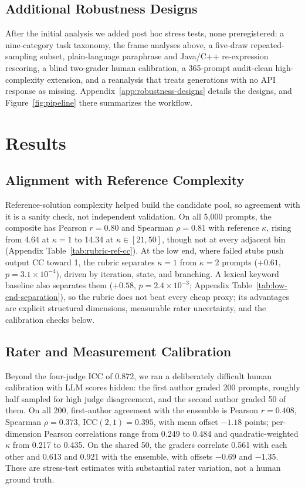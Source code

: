 \documentclass{article}
\begin{document}
\subsection{Additional Robustness Designs}
After the initial analysis we added post hoc stress tests, none preregistered: a nine-category task taxonomy, the frame analyses above, a five-draw repeated-sampling subset, plain-language paraphrase and Java/C++ re-expression rescoring, a blind two-grader human calibration, a 365-prompt audit-clean high-complexity extension, and a reanalysis that treats generations with no API response as missing. Appendix~\ref{app:robustness-designs} details the designs, and Figure~\ref{fig:pipeline} there summarizes the workflow.

\section{Results}

\subsection{Alignment with Reference Complexity}

Reference-solution complexity helped build the candidate pool, so agreement with it is a sanity check, not independent validation. On all 5{,}000 prompts, the composite has Pearson $r=0.80$ and Spearman $\rho=0.81$ with reference $\kappa$, rising from 4.64 at $\kappa=1$ to 14.34 at $\kappa\in[21,50]$, though not at every adjacent bin (Appendix Table~\ref{tab:rubric-ref-cc}). At the low end, where failed stubs push output CC toward 1, the rubric separates $\kappa=1$ from $\kappa=2$ prompts ($+0.61$, $p=3.1\times10^{-4}$), driven by iteration, state, and branching. A lexical keyword baseline also separates them ($+0.58$, $p=2.4\times10^{-3}$; Appendix Table~\ref{tab:low-end-separation}), so the rubric does not beat every cheap proxy; its advantages are explicit structural dimensions, measurable rater uncertainty, and the calibration checks below.

\subsection{Rater and Measurement Calibration}

Beyond the four-judge ICC of 0.872, we ran a deliberately difficult human calibration with LLM scores hidden: the first author graded 200 prompts, roughly half sampled for high judge disagreement, and the second author graded 50 of them. On all 200, first-author agreement with the ensemble is Pearson $r=0.408$, Spearman $\rho=0.373$, ICC$(2,1)=0.395$, with mean offset $-1.18$ points; per-dimension Pearson correlations range from 0.249 to 0.484 and quadratic-weighted $\kappa$ from 0.217 to 0.435. On the shared 50, the graders correlate 0.561 with each other and 0.613 and 0.921 with the ensemble, with offsets $-0.69$ and $-1.35$. These are stress-test estimates with substantial rater variation, not a human ground truth.
\end{document}
